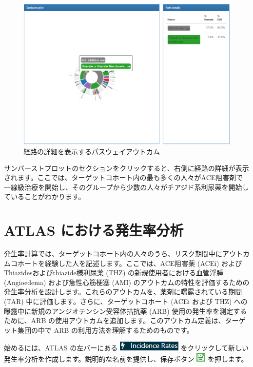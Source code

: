 \documentclass[
  11pt]{book}
\theoremstyle{definition}
\theoremstyle{definition}
\theoremstyle{definition}
\theoremstyle{definition}
\theoremstyle{remark}
\begin{document}
\begin{figure}

{\centering \includegraphics[width=1\linewidth]{images/Characterization/atlasPathwaysResultsPathDetails} 

}

\caption{経路の詳細を表示するパスウェイアウトカム}\label{fig:atlasPathwaysResultsPathDetails}
\end{figure}

サンバーストプロットのセクションをクリックすると、右側に経路の詳細が表示されます。ここでは、ターゲットコホート内の最も多くの人々がACE阻害剤で一線級治療を開始し、そのグループから少数の人々がチアジド系利尿薬を開始していることがわかります。

\section{ATLAS における発生率分析}\label{atlas-ux306bux304aux3051ux308bux767aux751fux7387ux5206ux6790}

発生率計算では、ターゲットコホート内の人々のうち、リスク期間中にアウトカムコホートを経験した人を記述します。ここでは、ACE阻害薬 (ACEi) およびThiazidesおよびthiazide様利尿薬 (THZ) の新規使用者における血管浮腫 (Angioedema) および急性心筋梗塞 (AMI) のアウトカムの特性を評価するための発生率分析を設計します。これらのアウトカムを、薬剤に曝露されている期間 (TAR) 中に評価します。さらに、ターゲットコホート (ACEi および THZ) への曝露中に新規のアンジオテンシン受容体拮抗薬 (ARB) 使用の発生率を測定するために、ARB の使用アウトカムを追加します。このアウトカム定義は、ターゲット集団の中で ARB の利用方法を理解するためのものです。

始めるには、ATLAS の左バーにある \includegraphics{images/Characterization/atlasIncidenceMenuItem.png} をクリックして新しい発生率分析を作成します。説明的な名前を提供し、保存ボタン \includegraphics{images/PopulationLevelEstimation/save.png} を押します。
\end{document}
